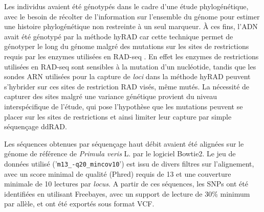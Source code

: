 Les individus avaient été génotypés dans le cadre d'une étude phylogénétique, avec le besoin de récolter de l'information sur l'ensemble du génome pour estimer une histoire phylogénétique non restreinte à un seul marqueur. À ces fins, l'ADN avait été génotypé par la méthode hyRAD \citep{Suchan2016} car cette technique permet de génotyper le long du génome malgré des mutations sur les sites de restrictions requis par les enzymes utilisées en RAD-seq \citep{Davey2010}. En effet les enzymes de restrictions utilisées en RAD-seq sont sensibles à la mutation d'un nucléotide, tandis que les sondes ARN utilisées pour la capture de \textit{loci} dans la méthode hyRAD peuvent s'hybrider sur ces sites de restriction RAD visés, même mutés. La nécessité de capturer des sites malgré une variance génétique provient du niveau interspécifique de l'étude, qui pose l'hypothèse que les mutations peuvent se placer sur les sites de restrictions et ainsi limiter leur capture par simple séquençage ddRAD. 

Les séquences obtenues par séquençage haut débit avaient été alignées sur le génome de référence de \textit{Primula veris} L. par le logiciel Bowtie2. Le jeu de données utilisé ('\verb|m13_-q20_mincov10|') est issu de divers filtres sur l'alignement, avec un score minimal de qualité (Phred) requis de 13 et une couverture minimale de 10 lectures par \textit{locus}. A partir de ces séquences, les SNPs ont été identifiées en utilisant Freebayes, avec un support de lecture de 30\% minimum par allèle, et ont été exportés sous format VCF.

